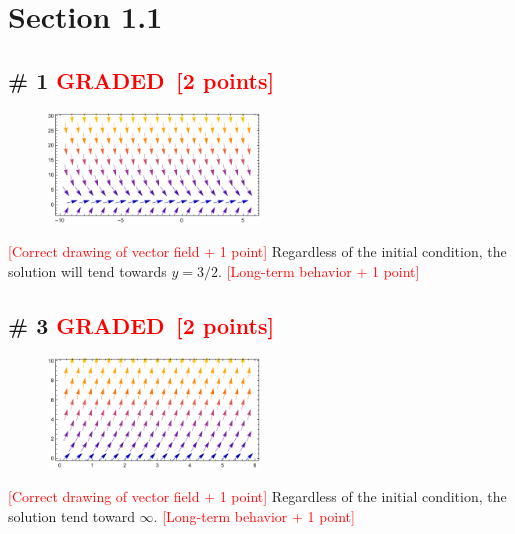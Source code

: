 \documentclass[12pt,letterpaper]{exam}
\newcommand{\grade}{\textcolor{red}{GRADED}}
\newcommand{\pts}[1]{\textcolor{red}{[#1]}}
\begin{document}
\section*{Section 1.1}

\subsection*{\# 1 \grade \, \pts{2 points}}

 \begin{figure}[h!]
\centering
\includegraphics[width=0.5\textwidth]{./1p1_1.pdf}
\end{figure}
\noindent
\pts{Correct drawing of vector field + 1 point}
Regardless of the initial condition, the solution will tend towards $y=3/2$. 
\pts{Long-term behavior + 1 point}

\subsection*{\# 3 \grade \, \pts{2 points}}

 \begin{figure}[h!]
\centering
\includegraphics[width=0.5\textwidth]{./1p1_3.pdf}
\end{figure}
\noindent \pts{Correct drawing of vector field + 1 point}
Regardless of the initial condition, the solution tend toward $\infty$.  
\pts{Long-term behavior + 1 point}
\end{document}

